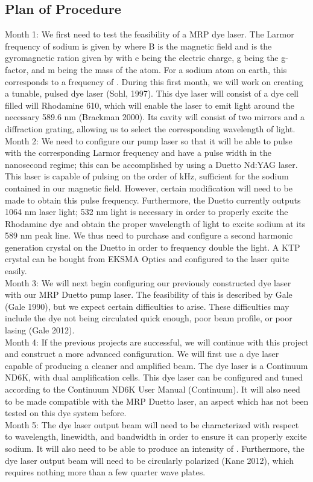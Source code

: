 \documentclass{article}
\begin{document}
\subsection{Plan of Procedure}
Month 1: We first need to test the feasibility of a MRP dye laser. The Larmor frequency of sodium is given by  where B is the magnetic field and  is the gyromagnetic ration given by  with e being the electric charge, g being the g-factor, and m being the mass of the atom. For a sodium atom on earth, this corresponds to a frequency of . During this first month, we will work on creating a tunable, pulsed dye laser (Sohl, 1997). This dye laser will consist of a dye cell filled will Rhodamine 610, which will enable the laser to emit light around the necessary 589.6 nm (Brackman 2000). Its cavity will consist of two mirrors and a diffraction grating, allowing us to select the corresponding wavelength of light.\\
Month 2: We need to configure our pump laser so that it will be able to pulse with the corresponding Larmor frequency and have a pulse width in the nanosecond regime; this can be accomplished by using a Duetto Nd:YAG laser. This laser is capable of pulsing on the order of kHz, sufficient for the sodium contained in our magnetic field. However, certain modification will need to be made to obtain this pulse frequency. Furthermore, the Duetto currently outputs 1064 nm laser light; 532 nm light is necessary in order to properly excite the Rhodamine dye and obtain the proper wavelength of light to excite sodium at its 589 nm peak line. We thus need to purchase and configure a second harmonic generation crystal on the Duetto in order to frequency double the light. A KTP crystal can be bought from EKSMA Optics and configured to the laser quite easily.\\
Month 3: We will next begin configuring our previously constructed dye laser with our MRP Duetto pump laser. The feasibility of this is described by Gale (Gale 1990), but we expect certain difficulties to arise. These difficulties may include the dye not being circulated quick enough, poor beam profile, or poor lasing (Gale 2012).\\
Month 4: If the previous projects are successful, we will continue with this project and construct a more advanced configuration. We will first use a dye laser capable of producing a cleaner and amplified beam. The dye laser is a Continuum ND6K, with dual amplification cells. This dye laser can be configured and tuned according to the Continuum ND6K User Manual (Continuum). It will also need to be made compatible with the MRP Duetto laser, an aspect which has not been tested on this dye system before.\\
Month 5: The dye laser output beam will need to be characterized with respect to wavelength, linewidth, and bandwidth in order to ensure it can properly excite sodium. It will also need to be able to produce an intensity of . Furthermore, the dye laser output beam will need to be circularly polarized (Kane 2012), which requires nothing more than a few quarter wave plates.\\
\end{document}
